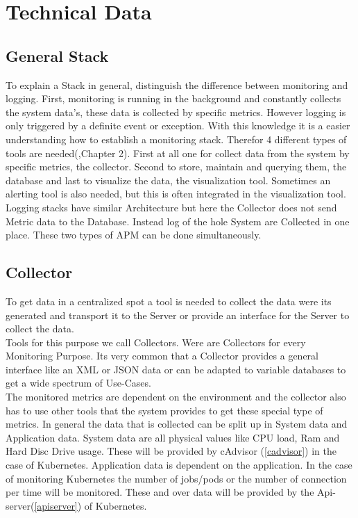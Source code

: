  
\chapter{Technical Data}
\label{chap:ch2}
\section{General Stack}
To explain a Stack in general, distinguish the difference between monitoring and logging. First, monitoring is running in the background and constantly collects the system data's, these data is collected by specific metrics. However logging is only triggered by a definite event or exception.
With this knowledge it is a easier understanding how to establish a monitoring stack. Therefor 4 different types of tools are needed(\cite{cau37427},Chapter 2).
First at all one for collect data from the system by specific metrics, the collector. Second to store, maintain and querying them, the database and last to visualize the data, the visualization tool. Sometimes an alerting tool is also needed, but this is often integrated in the visualization tool.\\ 
Logging stacks have similar Architecture but here the Collector does not send Metric data to the Database. Instead log of the hole System are Collected in one place. These two types of APM can be done simultaneously.

\section{Collector}
To get data in a centralized spot a tool is needed to collect the data were its generated and transport it to the Server or provide an interface for the Server to collect the data.\\
Tools for this purpose we call Collectors. Were are Collectors for every Monitoring Purpose. Its very common that a Collector provides a general interface like an XML or JSON data or can be adapted to variable databases to get a wide spectrum of Use-Cases.\\
 The monitored metrics are dependent on the environment and the collector also has to use other tools that the system provides  to get these special type of metrics. In general the data that is collected can be split up in System data and Application data. System data are all physical values like CPU load, Ram and Hard Disc Drive usage. These will be provided by cAdvisor (\ref{cadvisor}) in the case of Kubernetes. Application data is dependent on the application. In the case of monitoring Kubernetes the number of jobs/pods or the number of connection per time will be monitored. These and over data will be provided by the Api-server(\ref{apiserver}) of Kubernetes.
